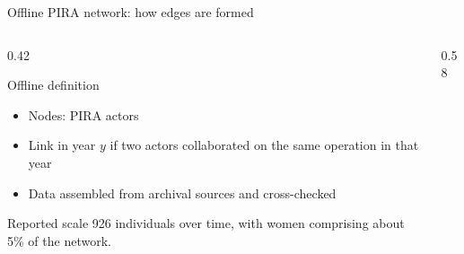 \begin{frame}{Offline PIRA network: how edges are formed}
  \small
  \begin{columns}[T,onlytextwidth]
    \begin{column}{0.42\textwidth}
      \begin{block}{Offline definition}
        \begin{itemize}
          \item Nodes: PIRA actors
          \item Link in year $y$ if two actors collaborated on the same operation in that year
          \item Data assembled from archival sources and cross-checked
        \end{itemize}
      \end{block}

      \begin{exampleblock}{Reported scale}
        926 individuals over time, with women comprising about 5\% of the network.
      \end{exampleblock}
    \end{column}

    \begin{column}{0.58\textwidth}
    \end{column}
  \end{columns}

\end{frame}

